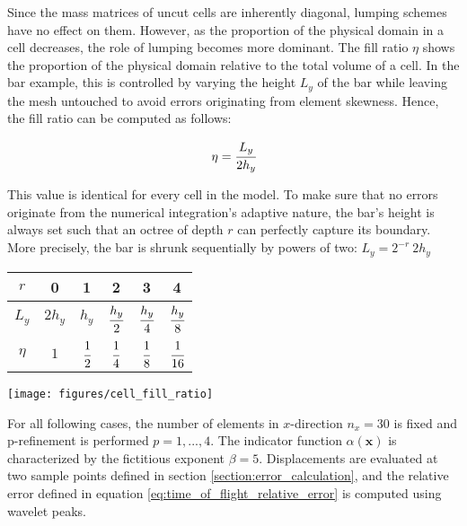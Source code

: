 Since the mass matrices of uncut cells are inherently diagonal, lumping schemes have no effect on them. However, as the proportion of the physical domain in a cell decreases, the role of lumping becomes more dominant. The fill ratio $\eta$ shows the proportion of the physical domain relative to the total volume of a cell. In the bar example, this is controlled by varying the height $L_y$ of the bar while leaving the mesh untouched to avoid errors originating from element skewness. Hence, the fill ratio can be computed as follows:

\begin{equation} \label{eq:fill_ratio}
	\eta = \cfrac{L_y}{2h_y}
\end{equation}

This value is identical for every cell in the model. To make sure that no errors originate from the numerical integration's adaptive nature, the bar's height is always set such that an octree of depth $r$ can perfectly capture its boundary. More precisely, the bar is shrunk sequentially by powers of two: $L_y = 2 ^{-r} \ 2h_y$

\begin{center}
\begin{minipage}[b]{0.45\textwidth}
	\centering
	\bgroup
		\def\arraystretch{2.5}
		\begin{tabular}{|c||c|c|c|c|c|}
			\hline
			$r$ & 0 & 1 & 2 & 3 & 4 \\
			\hline
			$L_y$ & $2h_y$ & $h_y$ & $\cfrac{h_y}{2}$ & $\cfrac{h_y}{4}$ & $\cfrac{h_y}{8}$ \\ 
			\hline
			$\eta$ & $1$ & $\cfrac{1}{2}$ & $\cfrac{1}{4}$ & $\cfrac{1}{8}$ & $\cfrac{1}{16}$ \\
			\hline
		\end{tabular}
	\egroup
\end{minipage}
\hfill
\begin{minipage}[b]{0.45\textwidth}
	\centering
	\texttt{[image: figures/cell\_fill\_ratio]}
\end{minipage}
\end{center}

For all following cases, the number of elements in $x$-direction $n_x=30$ is fixed and p-refinement is performed $p=1,...,4$. The indicator function $\alpha(\mathbf x)$ is characterized by the fictitious exponent $\beta = 5$. Displacements are evaluated at two sample points defined in section \ref{section:error_calculation}, and the relative error defined in equation \ref{eq:time_of_flight_relative_error} is computed using wavelet peaks.

